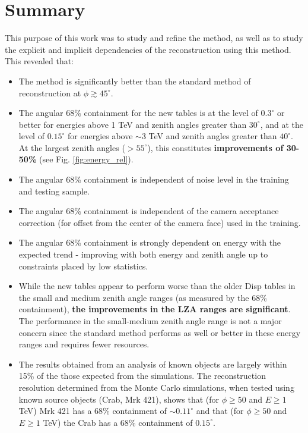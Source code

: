 \documentclass[main.tex]{subfiles}
\begin{document}
\section{Summary}
This purpose of this work was to study and refine the \disp method, as well as to study the explicit and implicit dependencies of the reconstruction using this method. This revealed that:

\begin{itemize}
\item The \disp method is significantly better than the standard method of reconstruction at $\phi\gtrsim45^\circ$.
\item The angular 68\% containment for the new \disp tables is at the level of $0.3^\circ$ or better for energies above 1 TeV and zenith angles greater than $30^\circ$, and at the level of $0.15^\circ$ for energies above $\sim$3 TeV and zenith angles greater than $40^\circ$. At the largest zenith angles ($>55^\circ$), this constitutes {\bf improvements of 30-50\%} (see Fig. \ref{fig:energy_rel}).
\item The angular 68\% containment is independent of noise level in the training and testing sample.
\item The angular 68\% containment is independent of the camera acceptance correction (for offset from the center of the camera face) used in the training.
\item The angular 68\% containment is strongly dependent on energy with the expected trend - improving with both energy and zenith angle up to constraints placed by low statistics.
\item While the new \disp tables appear to perform worse than the older Disp tables in the small and medium zenith angle ranges (as measured by the 68\% containment), \textbf{the improvements in the LZA ranges are significant}. The performance in the small-medium zenith angle range is not a major concern since the standard method performs as well or better in these energy ranges and requires fewer resources.
\item The results obtained from an analysis of known objects are largely within 15\% of the those expected from the simulations. The reconstruction resolution determined from the Monte Carlo simulations, when tested using known source objects (Crab, Mrk 421), shows that (for $\phi\geq50$ and $E\geq 1$ TeV) Mrk 421 has a 68\% containment of $\sim 0.11^\circ$ and that (for $\phi\geq50$ and $E\geq 1$ TeV) the Crab has a 68\% containment of $0.15^\circ$.
\end{itemize}
\end{document}
